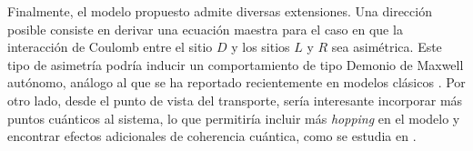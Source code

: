 Finalmente, el modelo propuesto admite diversas extensiones. Una dirección posible consiste en derivar una ecuación maestra para el caso en que la interacción de Coulomb entre el sitio \( D \) y los sitios \( L \) y \( R \) sea asimétrica. Este tipo de asimetría podría inducir un comportamiento de tipo Demonio de Maxwell autónomo, análogo al que se ha reportado recientemente en modelos clásicos \cite{monsel2025autonomous}. Por otro lado, desde el punto de vista del transporte, sería interesante incorporar más puntos cuánticos al sistema, lo que permitiría incluir más \textit{hopping} en el modelo y encontrar efectos adicionales de coherencia cuántica, como se estudia en \cite{khandelwal2025maximal}.








